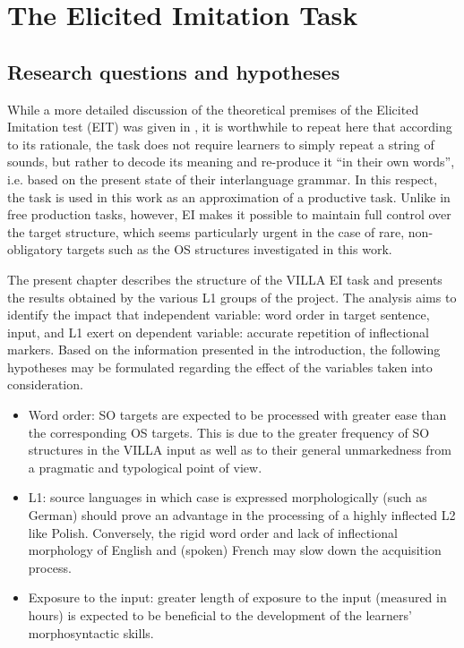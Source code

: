 \chapter{The Elicited Imitation Task}\label{sec:3}

\section{Research questions and hypotheses}\label{sec:04:1}

While a more detailed discussion of the theoretical premises of the Elicited Imitation test (EIT) was given in , it is worthwhile to repeat here that according to its rationale, the task does not require learners to simply repeat a string of sounds, but rather to decode its meaning and re-produce it ``in their own words'', i.e. based on the present state of their interlanguage grammar. In this respect, the task is used in this work as an approximation of a productive task. Unlike in free production tasks, however, EI makes it possible to maintain full control over the target structure, which seems particularly urgent in the case of rare, non-obligatory targets such as the OS structures investigated in this work.

The present chapter describes the structure of the VILLA EI task and presents the results obtained by the various L1 groups of the project. The analysis aims to identify the impact that independent variable: word order in target sentence, input, and L1 exert on dependent variable: accurate repetition of inflectional markers. Based on the information presented in the introduction, the following hypotheses may be formulated regarding the effect of the variables taken into consideration.

\begin{itemize}
    \item Word order: SO targets are expected to be processed with greater ease than the corresponding OS targets. This is due to the greater frequency of SO structures in the VILLA input as well as to their general unmarkedness from a pragmatic and typological point of view.
    \item L1: source languages in which case is expressed morphologically (such as German) should prove an advantage in the processing of a highly inflected L2 like Polish. Conversely, the rigid word order and lack of inflectional morphology of English and (spoken) French may slow down the acquisition process.
    \item Exposure to the input: greater length of exposure to the input (measured in hours) is expected to be beneficial to the development of the learners’ morphosyntactic skills.
\end{itemize}

